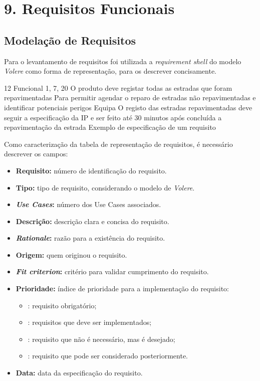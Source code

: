 \chapter*{9. Requisitos Funcionais}


\section*{Modelação de Requisitos}
{\TextoCor
Para o levantamento de requisitos foi utilizada a \textit{requirement shell} do modelo \textit{Volere} como forma de representação, para os descrever concisamente.
}

\req
    {12} %
    {Funcional} %
    {1, 7, 20} %
    {O produto deve registar todas as estradas que foram repavimentadas} %
    {Para permitir agendar o reparo de estradas não repavimentadas e identificar potenciais perigos} %
    {Equipa} %
    {O registo das estradas repavimentadas deve seguir a especificação da IP e ser feito até 30 minutos após concluída a repavimentação da estrada} %
    {\prioMust} %
    {Exemplo de especificação de um requisito} %


{\TextoCor
Como caracterização da tabela de representação de requisitos, é necessário descrever os campos:
\begin{itemize}
    \item \textbf{Requisito:} número de identificação do requisito.
    \item \textbf{Tipo:} tipo de requisito, considerando o modelo de \textit{Volere}.
    \item \textbf{\textit{Use Cases}:} número dos Use Cases associados.
    \item \textbf{Descrição:} descrição clara e concisa do requisito.
    \item \textbf{\textit{Rationale}:} razão para a existência do requisito.
    \item \textbf{Origem:} quem originou o requisito.
    \item \textbf{\textit{Fit criterion}:} critério para validar cumprimento do requisito.
    \item \textbf{Prioridade:} índice de prioridade para a implementação do requisito:
    \begin{itemize}
        \item \prioMust: requisito obrigatório;
        \item \prioShould: requisitos que deve ser implementados;
        \item \prioCould: requisito que não é necessário, mas é desejado;
        \item \prioWont: requisito que pode ser considerado posteriormente.
    \end{itemize}
    \item \textbf{Data:} data da especificação do requisito.
\end{itemize}
}

